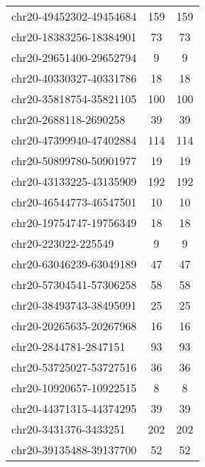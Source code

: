 \begin{longtable}{lSS}
	chr20-49452302-49454684 & 159    & 159                                       \\
	chr20-18383256-18384901 & 73     & 73                                        \\
	chr20-29651400-29652794 & 9      & 9                                         \\
	chr20-40330327-40331786 & 18     & 18                                        \\
	chr20-35818754-35821105 & 100    & 100                                       \\
	chr20-2688118-2690258   & 39     & 39                                        \\
	chr20-47399940-47402884 & 114    & 114                                       \\
	chr20-50899780-50901977 & 19     & 19                                        \\
	chr20-43133225-43135909 & 192    & 192                                       \\
	chr20-46544773-46547501 & 10     & 10                                        \\
	chr20-19754747-19756349 & 18     & 18                                        \\
	chr20-223022-225549     & 9      & 9                                         \\
	chr20-63046239-63049189 & 47     & 47                                        \\
	chr20-57304541-57306258 & 58     & 58                                        \\
	chr20-38493743-38495091 & 25     & 25                                        \\
	chr20-20265635-20267968 & 16     & 16                                        \\
	chr20-2844781-2847151   & 93     & 93                                        \\
	chr20-53725027-53727516 & 36     & 36                                        \\
	chr20-10920657-10922515 & 8      & 8                                         \\
	chr20-44371315-44374295 & 39     & 39                                        \\
	chr20-3431376-3433251   & 202    & 202                                       \\
	chr20-39135488-39137700 & 52     & 52                                        \\

\end{longtable}
